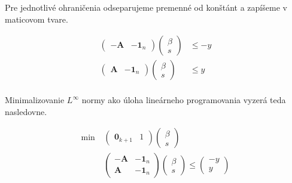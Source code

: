 \documentclass[12pt,oneside,a4paper,slovak]{article}
\begin{document}
Pre jednotlivé ohraničenia odseparujeme premenné od konštánt a zapíšeme v maticovom tvare.

\begin{align*}
	\left(
		\begin{array}{c|c}
			-\mathbf{A} & -\mathbf{1}_n
		\end{array}
	\right)
	\left(
		\begin{array}{c}
			\beta \\
			\hline
			s
		\end{array}
	\right) &\leq -y \\
	\left(
		\begin{array}{c|c}
			\mathbf{A} & -\mathbf{1}_n
		\end{array}
	\right)
	\left(
		\begin{array}{c}
			\beta \\
			\hline
			s
		\end{array}
	\right) &\leq y \\
\end{align*}

Minimalizovanie $L^{\infty}$ normy ako úloha lineárneho programovania vyzerá teda nasledovne.


\begin{align*}
	\text{min}~ &
	\left(
		\begin{array}{c|c}
			\mathbf{0}_{k+1} & 1
		\end{array}
	\right)
	\left(
		\begin{array}{c}
			\beta \\
			\hline
			s
		\end{array}
	\right) \\
	&\left(
		\begin{array}{c|c}
			-\mathbf{A} & -\mathbf{1}_n \\
			\hline
			\mathbf{A} & -\mathbf{1}_n
		\end{array}
	\right)
	\left(
		\begin{array}{c}
			\beta \\
			\hline
			s
		\end{array}
	\right)
	\leq
	\left(
		\begin{array}{c}
			-y \\
			\hline
			y
		\end{array}
	\right)
\end{align*}
\end{document}
